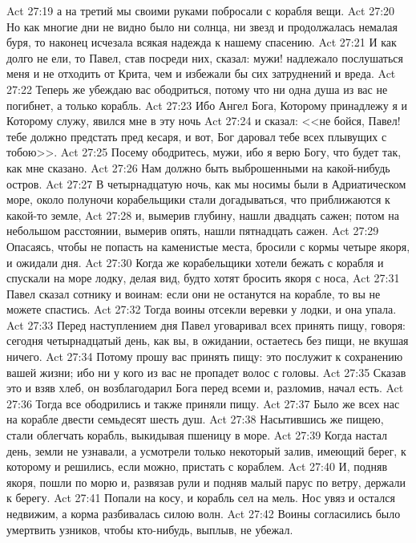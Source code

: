 \vs Act 27:19 а на третий мы своими руками побросали с корабля вещи.
\vs Act 27:20 Но как многие дни не видно было ни солнца, ни звезд и продолжалась немалая буря, то наконец исчезала всякая надежда к нашему спасению.
\vs Act 27:21 И как долго не ели, то Павел, став посреди них, сказал: мужи! надлежало послушаться меня и не отходить от Крита, чем и избежали бы сих затруднений и вреда.
\vs Act 27:22 Теперь же убеждаю вас ободриться, потому что ни одна душа из вас не погибнет, а только корабль.
\vs Act 27:23 Ибо Ангел Бога, Которому принадлежу я и Которому служу, явился мне в эту ночь
\vs Act 27:24 и сказал: <<не бойся, Павел! тебе должно предстать пред кесаря, и вот, Бог даровал тебе всех плывущих с тобою>>.
\vs Act 27:25 Посему ободритесь, мужи, ибо я верю Богу, что будет так, как мне сказано.
\vs Act 27:26 Нам должно быть выброшенными на какой-нибудь остров.
\rsbpar\vs Act 27:27 В четырнадцатую ночь, как мы носимы были в Адриатическом море, около полуночи корабельщики стали догадываться, что приближаются к какой-то земле,
\vs Act 27:28 и, вымерив глубину, нашли двадцать сажен; потом на небольшом расстоянии, вымерив опять, нашли пятнадцать сажен.
\vs Act 27:29 Опасаясь, чтобы не попасть на каменистые места, бросили с кормы четыре якоря, и ожидали дня.
\vs Act 27:30 Когда же корабельщики хотели бежать с корабля и спускали на море лодку, делая вид, будто хотят бросить якоря с носа,
\vs Act 27:31 Павел сказал сотнику и воинам: если они не останутся на корабле, то вы не можете спастись.
\vs Act 27:32 Тогда воины отсекли веревки у лодки, и она упала.
\vs Act 27:33 Перед наступлением дня Павел уговаривал всех принять пищу, говоря: сегодня четырнадцатый день, как вы, в ожидании, остаетесь без пищи, не вкушая ничего.
\vs Act 27:34 Потому прошу вас принять пищу: это послужит к сохранению вашей жизни; ибо ни у кого из вас не пропадет волос с головы.
\vs Act 27:35 Сказав это и взяв хлеб, он возблагодарил Бога перед всеми и, разломив, начал есть.
\vs Act 27:36 Тогда все ободрились и также приняли пищу.
\vs Act 27:37 Было же всех нас на корабле двести семьдесят шесть душ.
\vs Act 27:38 Насытившись же пищею, стали облегчать корабль, выкидывая пшеницу в море.
\vs Act 27:39 Когда настал день, земли не узнавали, а усмотрели только некоторый залив, имеющий  берег, к которому и решились, если можно, пристать с кораблем.
\vs Act 27:40 И, подняв якоря, пошли по морю и, развязав рули и подняв малый парус по ветру, держали к берегу.
\vs Act 27:41 Попали на косу, и корабль сел на мель. Нос увяз и остался недвижим, а корма разбивалась силою волн.
\vs Act 27:42 Воины согласились было умертвить узников, чтобы кто-нибудь, выплыв, не убежал.
